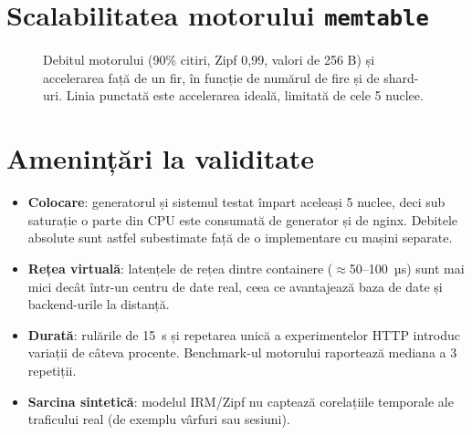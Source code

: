 

\section{Scalabilitatea motorului \texttt{memtable}}

\begin{figure}[H]
  \centering\resizebox{\linewidth}{!}{}
  \caption{Debitul motorului (90\% citiri, Zipf 0,99, valori de 256 B) și accelerarea față de un fir, în
           funcție de numărul de fire și de shard-uri. Linia punctată este accelerarea ideală, limitată de
           cele 5 nuclee.}
  \label{fig:engine}
\end{figure}



\section{Amenințări la validitate}

\begin{itemize}
  \item \textbf{Colocare}: generatorul și sistemul testat împart aceleași 5 nuclee, deci sub saturație o
        parte din CPU este consumată de generator și de nginx. Debitele absolute sunt astfel subestimate
        față de o implementare cu mașini separate.
  \item \textbf{Rețea virtuală}: latențele de rețea dintre containere ($\approx$50–100~µs) sunt mai mici
        decât într-un centru de date real, ceea ce avantajează baza de date și backend-urile la distanță.
  \item \textbf{Durată}: rulările de 15~s și repetarea unică a experimentelor HTTP introduc variații de
        câteva procente. Benchmark-ul motorului raportează mediana a 3 repetiții.
  \item \textbf{Sarcina sintetică}: modelul IRM/Zipf nu captează corelațiile temporale ale traficului real
        (de exemplu vârfuri sau sesiuni).
\end{itemize}

